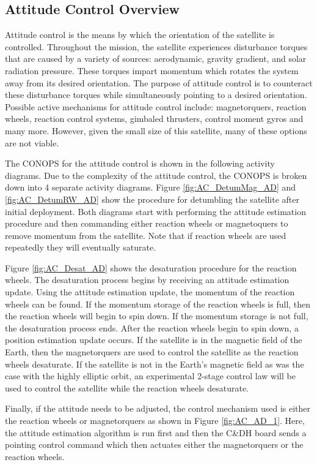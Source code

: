 \documentclass[conf]{new-aiaa}
\begin{document}
\subsection{Attitude Control Overview}
Attitude control is the means by which the orientation of the satellite is controlled. Throughout the mission, the satellite experiences disturbance torques that are caused by a variety of sources: aerodynamic, gravity gradient, and solar radiation pressure. These torques impart momentum which rotates the system away from its desired orientation. The purpose of attitude control is to counteract these disturbance torques while simultaneously pointing to a desired orientation. Possible active mechanisms for attitude control include: magnetorquers, reaction wheels, reaction control systems, gimbaled thrusters, control moment gyros and many more. However, given the small size of this satellite, many of these options are not viable.

The CONOPS for the attitude control is shown in the following activity diagrams. Due to the complexity of the attitude control, the CONOPS is broken down into 4 separate activity diagrams. Figure \ref{fig:AC_DetumMag_AD} and \ref{fig:AC_DetumRW_AD} show the procedure for detumbling the satellite after initial deployment. Both diagrams start with performing the attitude estimation procedure and then commanding either reaction wheels or magnetoquers to remove momentum from the satellite. Note that if reaction wheels are used repeatedly they will eventually saturate.

Figure \ref{fig:AC_Desat_AD} shows the desaturation procedure for the reaction wheels. The desaturation process begins by receiving an attitude estimation update. Using the attitude estimation update, the momentum of the reaction wheels can be found. If the momentum storage of the reaction wheels is full, then the reaction wheels will begin to spin down. If the momentum storage is not full, the desaturation process ends. After the reaction wheels begin to spin down, a position estimation update occurs. If the satellite is in the magnetic field of the Earth, then the magnetorquers are used to control the satellite as the reaction wheels desaturate. If the satellite is not in the Earth's magnetic field as was the case with the highly elliptic orbit, an experimental 2-stage control law will be used to control the satellite while the reaction wheels desaturate. 

Finally, if the attitude needs to be adjusted, the control mechanism used is either the reaction wheels or magnetorquers as shown in Figure \ref{fig:AC_AD_1}. Here, the attitude estimation algorithm is run first and then the C\&DH board sends a pointing control command which then actuates either the magnetorquers or the reaction wheels.
\end{document}
